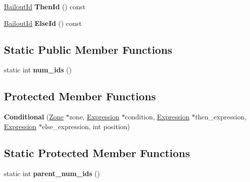 \begin{DoxyCompactItemize}
\item 
\hyperlink{classv8_1_1internal_1_1_bailout_id}{Bailout\+Id} {\bfseries Then\+Id} () const \hypertarget{classv8_1_1internal_1_1_conditional_ad41e5d6764a2355896918cae23f6a434}{}\label{classv8_1_1internal_1_1_conditional_ad41e5d6764a2355896918cae23f6a434}

\item 
\hyperlink{classv8_1_1internal_1_1_bailout_id}{Bailout\+Id} {\bfseries Else\+Id} () const \hypertarget{classv8_1_1internal_1_1_conditional_ad9310a4c15a26fcf3e3d4862b9ce8372}{}\label{classv8_1_1internal_1_1_conditional_ad9310a4c15a26fcf3e3d4862b9ce8372}

\end{DoxyCompactItemize}
\subsection*{Static Public Member Functions}
\begin{DoxyCompactItemize}
\item 
static int {\bfseries num\+\_\+ids} ()\hypertarget{classv8_1_1internal_1_1_conditional_a317bf8532dc1dc1b2fd6ca3ac9258381}{}\label{classv8_1_1internal_1_1_conditional_a317bf8532dc1dc1b2fd6ca3ac9258381}

\end{DoxyCompactItemize}
\subsection*{Protected Member Functions}
\begin{DoxyCompactItemize}
\item 
{\bfseries Conditional} (\hyperlink{classv8_1_1internal_1_1_zone}{Zone} $\ast$zone, \hyperlink{classv8_1_1internal_1_1_expression}{Expression} $\ast$condition, \hyperlink{classv8_1_1internal_1_1_expression}{Expression} $\ast$then\+\_\+expression, \hyperlink{classv8_1_1internal_1_1_expression}{Expression} $\ast$else\+\_\+expression, int position)\hypertarget{classv8_1_1internal_1_1_conditional_ad6cc4de369cb06532a04e457a92462c7}{}\label{classv8_1_1internal_1_1_conditional_ad6cc4de369cb06532a04e457a92462c7}

\end{DoxyCompactItemize}
\subsection*{Static Protected Member Functions}
\begin{DoxyCompactItemize}
\item 
static int {\bfseries parent\+\_\+num\+\_\+ids} ()\hypertarget{classv8_1_1internal_1_1_conditional_a015c14929554b08bfb9abc7ede336f01}{}\label{classv8_1_1internal_1_1_conditional_a015c14929554b08bfb9abc7ede336f01}

\end{DoxyCompactItemize}
